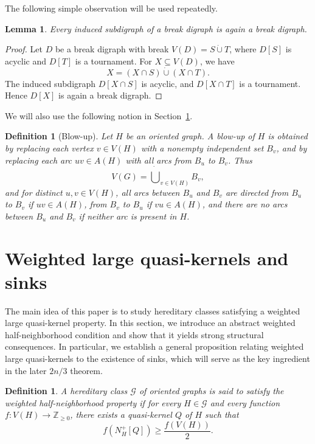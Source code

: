 \documentclass[11pt,a4paper]{article}
\newtheorem{lemma}[theorem]{Lemma}
\newtheorem{definition}[theorem]{Definition}
\begin{document}
The following simple observation will be used repeatedly.

\begin{lemma}\label{lem:hereditary-break}
Every induced subdigraph of a break digraph is again a break digraph.
\end{lemma}

\begin{proof}
Let \(D\) be a break digraph with break \(V(D)=S\dot\cup T\), where \(D[S]\) is
acyclic and \(D[T]\) is a tournament. For \(X\subseteq V(D)\), we have
\[
    X=(X\cap S)\dot\cup (X\cap T).
\]
The induced subdigraph \(D[X\cap S]\) is acyclic, and \(D[X\cap T]\) is a
tournament. Hence \(D[X]\) is again a break digraph.
\end{proof}

We will also use the following notion in Section~\ref{sink-version}.

\begin{definition}[Blow-up]
Let \(H\) be an oriented graph. A \emph{blow-up} of \(H\) is obtained by
replacing each vertex \(v\in V(H)\) with a nonempty independent set \(B_v\), and
by replacing each arc \(uv\in A(H)\) with all arcs from \(B_u\) to \(B_v\). Thus
\[
    V(G)=\dot\bigcup_{v\in V(H)}B_v,
\]
and for distinct \(u,v\in V(H)\), all arcs between \(B_u\) and \(B_v\) are
directed from \(B_u\) to \(B_v\) if \(uv\in A(H)\), from \(B_v\) to \(B_u\) if
\(vu\in A(H)\), and there are no arcs between \(B_u\) and \(B_v\) if neither
arc is present in \(H\).
\end{definition}


\section{Weighted large quasi-kernels and sinks}\label{sink-version}

The main idea of this paper is to study hereditary classes satisfying a weighted large quasi-kernel property. In this section, we introduce an abstract weighted half-neighborhood condition and show that it yields strong structural consequences. In particular, we establish a general proposition relating weighted large quasi-kernels to the existence of sinks, which will serve as the key ingredient in the later \(2n/3\) theorem.

\begin{definition}
A hereditary class \(\mathcal G\) of oriented graphs is said to satisfy the
\emph{weighted half-neighborhood property} if for every \(H\in\mathcal G\) and
every function \(f:V(H)\to\mathbb Z_{\ge0}\), there exists a quasi-kernel
\(Q\) of \(H\) such that
\[
    f(N_H^+[Q])\ge \frac{f(V(H))}{2}.
\]
\end{definition}
\end{document}
